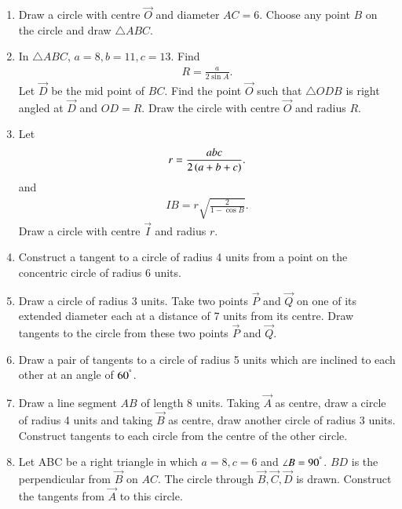 \documentclass[journal,12pt,twocolumn]{IEEEtran}
\renewcommand\thesection{\arabic{section}}
\begin{document}
\begin{enumerate}[label=\thesection.\arabic*
,ref=\thesection.\theenumi]
\item Draw a circle with centre $\vec{O}$ and diameter $AC = 6$.  Choose any point $B$ on the circle and draw $\triangle ABC$.
\item In $\triangle ABC$, $a =8, b = 11, c = 13$. Find 
\begin{align}
R = \frac{a}{2\sin A}.
\end{align}
%
Let $\vec{D}$ be the mid point of $BC$.  Find the point $\vec{O}$ such that $\triangle ODB$ is right angled at $\vec{D}$ and $OD=R$. Draw the circle with centre $\vec{O}$ and radius $R$.
\item Let 
\begin{align}
r = \frac{abc}{2\left(a+b+c\right)}.
\end{align}
and 
\begin{align}
IB = r\sqrt{\frac{2}{1-\cos B}}.
\end{align}
%
Draw a circle with centre $\vec{I}$ and radius $r$.

\item Construct a tangent to a circle of radius 4 units from a point on the concentric circle of radius 6 
units.
\item Draw a circle of radius 3 units. Take  two points $\vec{P}$ and $\vec{Q}$ on one of its extended 
diameter each at a distance of 7 units from its centre. Draw tangents to the circle from these two points 
$\vec{P}$ and $\vec{Q}$.
\item Draw a pair of tangents to a circle of radius 5 units which are inclined to each other at an angle of 
$60^{\degree}$.
\item Draw a line segment $AB$ of length 8 units. Taking $\vec{A}$ as centre, draw a circle of radius 4 units 
and taking $\vec{B}$ as centre, draw another circle of radius 3 units. Construct tangents to each circle from 
the centre of the other circle.
\item Let ABC be a right triangle in which $a = 8, c = 6$ and $\angle B = 90^{\degree}$.  $BD$ is the 
perpendicular from $\vec{B}$ on $AC$. The circle through $\vec{B}, \vec{C}, \vec{D}$ is drawn.  Construct the 
tangents from $\vec{A}$ to this circle.
\end{enumerate}
\end{document}
